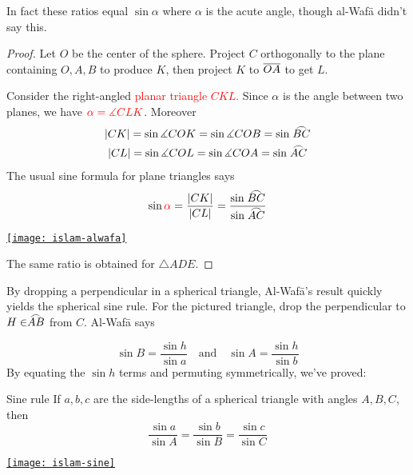 In fact these ratios equal $\sin\alpha$ where $\alpha$ is the acute angle, though al-Wafā didn't say this.

\begin{proof}
	Let $O$ be the center of the sphere. Project $C$ orthogonally to the plane containing $O,A,B$ to produce $K$, then project $K$ to $\overline{OA}$ to get $L$.\par
	\begin{minipage}[t]{0.55\linewidth}\vspace{-5pt}
		Consider the right-angled \textcolor{red}{planar triangle $CKL$.} Since $\alpha$ is the angle between two planes, we have $\textcolor{red}{\alpha=\measuredangle CLK}$. Moreover
		\begin{gather*}
			\nm{CK}=\sin\measuredangle COK =\sin\measuredangle COB=\sin\arc{BC}\\
			\nm{CL}=\sin\measuredangle COL =\sin\measuredangle COA=\sin\arc{AC}
		\end{gather*}
		The usual sine formula for plane triangles says
		\[
			\sin\textcolor{red}{\alpha} =\frac{\nm{CK}}{\nm{CL}} =\frac{\sin\arc{BC}}{\sin \arc{AC}}
		\]
	\end{minipage}
	\hfill
	\begin{minipage}[t]{0.4\linewidth}\vspace{-15pt}
		\flushright
		\href{http://math.uci.edu/~ndonalds/math184/islam-alwafa.html}{\texttt{[image: islam-alwafa]}}
	\end{minipage}
	\par\vspace{-3pt}
	The same ratio is obtained for $\triangle ADE$.
\end{proof}

\goodbreak

By dropping a perpendicular in a spherical triangle, Al-Wafā's result quickly yields the spherical sine rule. For the pictured triangle, drop the perpendicular to $H\in\arc{AB}$ from $C$. Al-Wafā says\par
\begin{minipage}[t]{0.65\linewidth}\vspace{0pt}
	\[
		\sin B=\frac{\sin h}{\sin a}
		\quad\text{and}\quad 
		\sin A=\frac{\sin h}{\sin b}
	\]
	By equating the $\sin h$ terms and permuting symmetrically, we've proved:

	\begin{cor*}{Sine rule}{}
		If $a,b,c$ are the side-lengths of a spherical triangle with angles $A,B,C$, then
		\[
			\frac{\sin a}{\sin A}=\frac{\sin b}{\sin B}=\frac{\sin c}{\sin C}
		\]
	\end{cor*}
\end{minipage}
\hfill
\begin{minipage}[t]{0.34\linewidth}\vspace{0pt}
	\flushright
	\href{http://math.uci.edu/~ndonalds/math184/islam-sine.html}{\texttt{[image: islam-sine]}}
\end{minipage}
\medbreak

